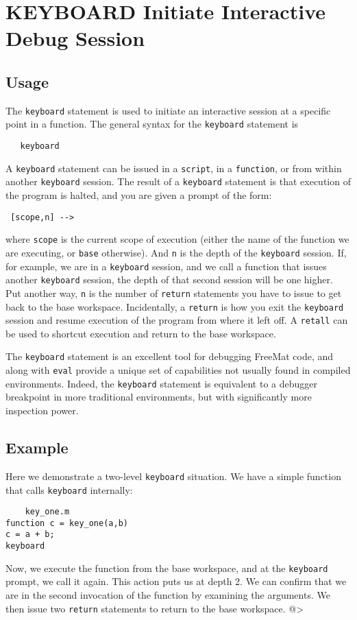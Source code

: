 \section{KEYBOARD Initiate Interactive Debug Session}

\subsection{Usage}

The \verb|keyboard| statement is used to initiate an
interactive session at a specific point in a function.
The general syntax for the \verb|keyboard| statement is
\begin{verbatim}
   keyboard
\end{verbatim}
A \verb|keyboard| statement can be issued in a \verb|script|,
in a \verb|function|, or from within another \verb|keyboard| session.
The result of a \verb|keyboard| statement is that execution
of the program is halted, and you are given a prompt
of the form:
\begin{verbatim}
 [scope,n] -->
\end{verbatim}
where \verb|scope| is the current scope of execution (either
the name of the function we are executing, or \verb|base| otherwise).
And \verb|n| is the depth of the \verb|keyboard| session. If, for example,
we are in a \verb|keyboard| session, and we call a function that issues
another \verb|keyboard| session, the depth of that second session 
will be one higher.  Put another way, \verb|n| is the number of \verb|return|
statements you have to issue to get back to the base workspace.
Incidentally, a \verb|return| is how you exit the \verb|keyboard| session
and resume execution of the program from where it left off.  A
\verb|retall| can be used to shortcut execution and return to the base
workspace.

The \verb|keyboard| statement is an excellent tool for debugging
FreeMat code, and along with \verb|eval| provide a unique set of
capabilities not usually found in compiled environments.  Indeed,
the \verb|keyboard| statement is equivalent to a debugger breakpoint in 
more traditional environments, but with significantly more inspection
power.
\subsection{Example}

Here we demonstrate a two-level \verb|keyboard| situation.  We have
a simple function that calls \verb|keyboard| internally:
\begin{verbatim}
    key_one.m
function c = key_one(a,b)
c = a + b;
keyboard
\end{verbatim}
Now, we execute the function from the base workspace, and
at the \verb|keyboard| prompt, we call it again.  This action
puts us at depth 2.  We can confirm that we are in the second
invocation of the function by examining the arguments.  We
then issue two \verb|return| statements to return to the base
workspace.
@>
